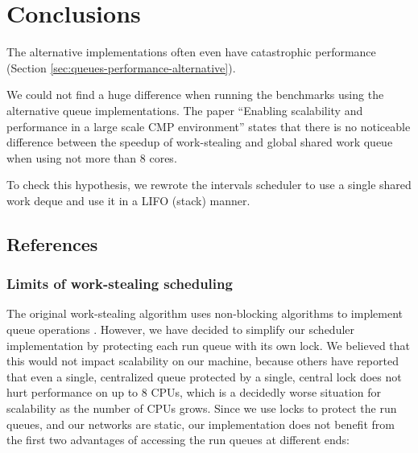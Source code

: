 
\chapter{Conclusions}
\label{chap:queues-conclusions}


The alternative implementations often even have catastrophic
performance (Section \ref{sec:queues-performance-alternative}).

We could not find a huge difference when running the benchmarks using
the alternative queue implementations. The paper ``Enabling
scalability and performance in a large scale CMP environment''
\cite{Saha2007} states that there is no noticeable difference between
the speedup of work-stealing and global shared work queue when using
not more than 8 cores.

To check this hypothesis, we rewrote the intervals scheduler to use a
single shared work deque and use it in a LIFO (stack) manner.


\section{References}

\subsection{Limits of work-stealing scheduling \cite{Vrba2009}}

The original work-stealing algorithm uses non-blocking algorithms to
implement queue operations \cite{Arora2001}. However, we have decided
to simplify our scheduler implementation by protecting each run queue
with its own lock. We believed that this would not impact scalability
on our machine, because others \cite{Saha2007} have reported that even
a single, centralized queue protected by a single, central lock does
not hurt performance on up to 8 CPUs, which is a decidedly worse
situation for scalability as the number of CPUs grows. Since we use
locks to protect the run queues, and our networks are static, our
implementation does not benefit from the first two advantages of
accessing the run queues at different ends:

